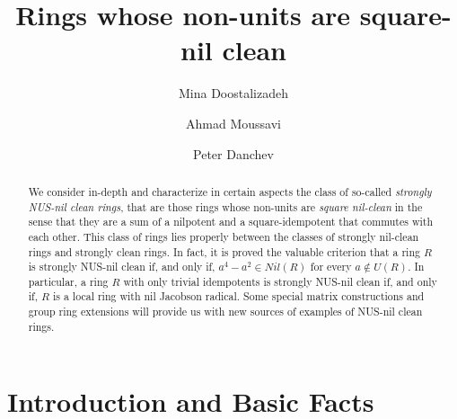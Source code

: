 \documentclass[12pt]{amsart}
\theoremstyle{definition}
\begin{document}
	
\author[M. Doostalizadeh]{Mina Doostalizadeh}
\address{Department of Mathematics, Tarbiat Modares University, 14115-111 Tehran Jalal AleAhmad Nasr, Iran}
\author[A. Moussavi]{Ahmad Moussavi}
\address{Department of Mathematics, Tarbiat Modares University, 14115-111 Tehran Jalal AleAhmad Nasr, Iran}
\author[P. Danchev]{Peter Danchev}
\address{Institute of Mathematics and Informatics, Bulgarian Academy of Sciences, 1113 Sofia, Bulgaria}

\title[Rings whose non-units are square-nil clean]{Rings whose non-units are square-nil clean}

\maketitle




\begin{abstract} We consider in-depth and characterize in certain aspects the class of so-called {\it strongly NUS-nil clean rings}, that are those rings whose non-units are {\it square nil-clean} in the sense that they are a sum of a  nilpotent and a square-idempotent that commutes with each other. This class of rings lies properly between the classes of strongly nil-clean rings and strongly clean rings. In fact, it is proved the valuable criterion that a ring $R$ is strongly NUS-nil clean if, and only if, $a^4-a^2\in Nil(R)$ for every $a\not\in U(R)$. In particular, a ring $R$ with only trivial idempotents is strongly NUS-nil clean if, and only if, $R$ is a local ring with nil Jacobson radical. Some special matrix constructions and group ring extensions will provide us with new sources of examples of NUS-nil clean rings.
\end{abstract}

\section{Introduction and Basic Facts}
\end{document}
